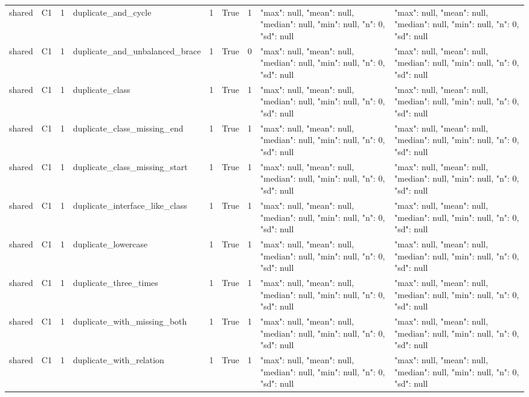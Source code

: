 \begin{tabular}{lllllllll}
shared & C1 & 1 & duplicate\_and\_cycle & 1 & True & 1 & {"max": null, "mean": null, "median": null, "min": null, "n": 0, "sd": null} & {"max": null, "mean": null, "median": null, "min": null, "n": 0, "sd": null} \\
shared & C1 & 1 & duplicate\_and\_unbalanced\_brace & 1 & True & 0 & {"max": null, "mean": null, "median": null, "min": null, "n": 0, "sd": null} & {"max": null, "mean": null, "median": null, "min": null, "n": 0, "sd": null} \\
shared & C1 & 1 & duplicate\_class & 1 & True & 1 & {"max": null, "mean": null, "median": null, "min": null, "n": 0, "sd": null} & {"max": null, "mean": null, "median": null, "min": null, "n": 0, "sd": null} \\
shared & C1 & 1 & duplicate\_class\_missing\_end & 1 & True & 1 & {"max": null, "mean": null, "median": null, "min": null, "n": 0, "sd": null} & {"max": null, "mean": null, "median": null, "min": null, "n": 0, "sd": null} \\
shared & C1 & 1 & duplicate\_class\_missing\_start & 1 & True & 1 & {"max": null, "mean": null, "median": null, "min": null, "n": 0, "sd": null} & {"max": null, "mean": null, "median": null, "min": null, "n": 0, "sd": null} \\
shared & C1 & 1 & duplicate\_interface\_like\_class & 1 & True & 1 & {"max": null, "mean": null, "median": null, "min": null, "n": 0, "sd": null} & {"max": null, "mean": null, "median": null, "min": null, "n": 0, "sd": null} \\
shared & C1 & 1 & duplicate\_lowercase & 1 & True & 1 & {"max": null, "mean": null, "median": null, "min": null, "n": 0, "sd": null} & {"max": null, "mean": null, "median": null, "min": null, "n": 0, "sd": null} \\
shared & C1 & 1 & duplicate\_three\_times & 1 & True & 1 & {"max": null, "mean": null, "median": null, "min": null, "n": 0, "sd": null} & {"max": null, "mean": null, "median": null, "min": null, "n": 0, "sd": null} \\
shared & C1 & 1 & duplicate\_with\_missing\_both & 1 & True & 1 & {"max": null, "mean": null, "median": null, "min": null, "n": 0, "sd": null} & {"max": null, "mean": null, "median": null, "min": null, "n": 0, "sd": null} \\
shared & C1 & 1 & duplicate\_with\_relation & 1 & True & 1 & {"max": null, "mean": null, "median": null, "min": null, "n": 0, "sd": null} & {"max": null, "mean": null, "median": null, "min": null, "n": 0, "sd": null} \\

\end{tabular}
